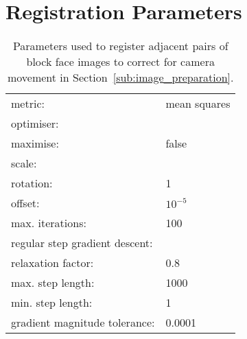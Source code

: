 \appendix
\dblspace

\chapter{Registration Parameters} %
\label{cha:registration_parameters}
  \begin{table}[h]
    \centering
    \begin{tabular}{|ll|}
      \hline
      metric: & mean squares \\
      \multicolumn{2}{|l|}{optimiser:} \\
      \quad maximise: & false\\
      \multicolumn{2}{|l|}{\quad scale:} \\
      \quad\quad rotation: & 1 \\
      \quad\quad offset: & $10^{-5}$ \\
      \quad max. iterations: & 100 \\
      \multicolumn{2}{|l|}{\quad regular step gradient descent:} \\
      \quad\quad relaxation factor: & 0.8 \\
      \quad\quad max. step length: & 1000 \\
      \quad\quad min. step length: & 1 \\
      \quad\quad gradient magnitude tolerance: & 0.0001 \\
      \hline
    \end{tabular}
      
    \caption{Parameters used to register adjacent pairs of block face images to correct for camera movement in Section~\ref{sub:image_preparation}.}
    \label{tab:block_face_to_block_face}
  \end{table}
  
